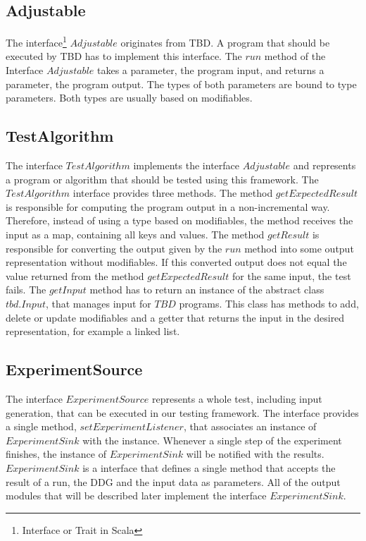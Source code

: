 \subsection{Adjustable}

The interface\footnote{Interface or Trait in Scala} $Adjustable$ originates from TBD. A program that should be executed by TBD has to implement this interface. The $run$ method of the Interface $Adjustable$ takes a parameter, the program input, and returns a parameter, the program output. The types of both parameters are bound to type parameters. Both types are usually based on modifiables. 

\subsection{TestAlgorithm}

The interface $TestAlgorithm$ implements the interface $Adjustable$ and represents a program or algorithm that should be tested using this framework. The $TestAlgorithm$ interface provides three methods. The method $getExpectedResult$ is responsible for computing the program output in a non-incremental way. Therefore, instead of using a type based on modifiables, the method receives the input as a map, containing all keys and values. The method $getResult$ is responsible for converting the output given by the $run$ method into some output representation without modifiables. If this converted output does not equal the value returned from the method $getExpectedResult$ for the same input, the test fails. The $getInput$ method has to return an instance of the abstract class $tbd.Input$, that manages input for $TBD$ programs. This class has methods to add, delete or update modifiables and a getter that returns the input in the desired representation, for example a linked list. 

\subsection{ExperimentSource}

The interface $ExperimentSource$ represents a whole test, including input generation, that can be executed in our testing framework. The interface provides a single method, $setExperimentListener$, that associates an instance of $ExperimentSink$ with the instance. Whenever a single step of the experiment finishes, the instance of $ExperimentSink$ will be notified with the results. $ExperimentSink$ is a interface that defines a single method that accepts the result of a run, the DDG and the input data as parameters. All of the output modules that will be described later implement the interface $ExperimentSink$.

